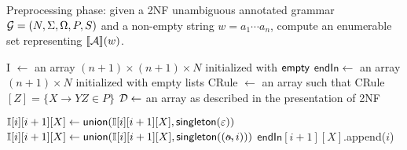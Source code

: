\begin{algorithm}[t]
	\caption{Preprocessing phase: given a 2NF
        unambiguous annotated grammar $\mathcal{G} = (N, \Sigma, \Omega, P, S)$ and
        a non-empty string $w = a_1\cdots a_n$, compute an enumerable set
        representing ${\llbracket{\mathcal{A}}\rrbracket}(w)$.}\label{gram:alg:preprocessing}
        \label{gram:alg:cubic}
		\begin{algorithmic}[1]
                  \State I $\gets$ an array $(n+1)\times (n+1)\times N$ initialized with $\mathsf{empty}$
                  \State  $\mathsf{endIn}\gets$ an array $(n+1)\times N$
                  initialized with empty lists
                  \State CRule $\gets$ an array such that CRule$[Z]=\{X\rightarrow YZ \in P \}$
                  \State $\mathcal{D} \gets $ an array as described in the presentation of 2NF

                   \label{gram:ln:initstart} 
                      \State $\mathbb{I}[i][i+1][X] \gets \mathsf{union}(\mathbb{I}[i][i+1][X], \textsf{singleton}(\varepsilon))$
                    \EndIf
                      \State $\tableI[i][i+1][X] \gets \union(\tableI[i][i+1][X], \singleton((\oout, i)))$
                    \EndFor
                    \If{$\tableI[i][i+1][X] \neq \empt$}
                      \State $\mathsf{endIn}[i+1][X]$.append($i$)
                      \label{gram:ln:endset1}
                    \EndIf
                  \EndFor \label{gram:ln:initend} 




\end{algorithmic}
\end{algorithm}
